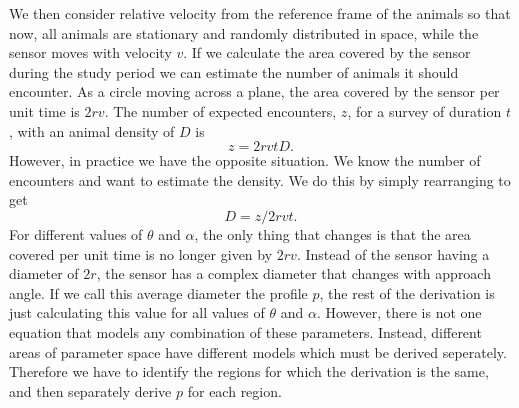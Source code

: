 \documentclass[a4paper,10pt,reqno,oneside]{amsart}
\begin{document}
We then consider relative velocity from the reference frame of the animals so that now, all animals are stationary and randomly distributed in space, while the sensor moves with velocity $v$. If we calculate the area covered by the sensor during the study period we can estimate the number of animals it should encounter. As a circle moving across a plane, the area covered by the sensor per unit time is $2rv$. The number of expected encounters, $z$, for a survey of duration $t$, with an animal density of $D$ is
\begin{equation}
	z = 2rvtD.
\end{equation}
However, in practice we have the opposite situation. We know the number of encounters and want to estimate the density. We do this by simply rearranging to get
\begin{equation}
	D = z/2rvt.
\end{equation}
For different values of $\theta$ and $\alpha$, the only thing that changes is that the area covered per unit time is no longer given by $2rv$. Instead of the sensor having a diameter of $2r$, the sensor has a complex diameter that changes with approach angle. If we call this average diameter the profile $p$, the rest of the derivation is just calculating this value for all values of $\theta$ and $\alpha$. However, there is not one equation that models any combination of these parameters. Instead, different areas of parameter space have different models which must be derived seperately. Therefore we have to identify the regions for which the derivation is the same, and then separately derive $p$ for each region. 
\end{document}
